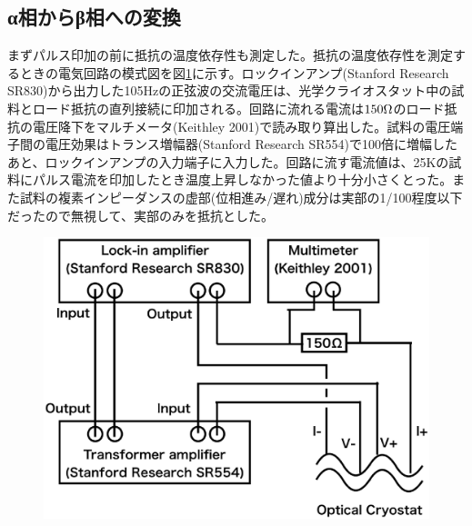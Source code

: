 \subsection{α相からβ相への変換}
まずパルス印加の前に抵抗の温度依存性も測定した。抵抗の温度依存性を測定するときの電気回路の模式図を図\ref{fig:schematics_lockin}に示す。ロックインアンプ(Stanford Research SR830)から出力した105Hzの正弦波の交流電圧は、光学クライオスタット中の試料とロード抵抗の直列接続に印加される。回路に流れる電流は$\rm 150\Omega$のロード抵抗の電圧降下をマルチメータ(Keithley 2001)で読み取り算出した。試料の電圧端子間の電圧効果はトランス増幅器(Stanford Research SR554)で100倍に増幅したあと、ロックインアンプの入力端子に入力した。回路に流す電流値は、25Kの試料にパルス電流を印加したとき温度上昇しなかった値より十分小さくとった。また試料の複素インピーダンスの虚部(位相進み/遅れ)成分は実部の1/100程度以下だったので無視して、実部のみを抵抗とした。
\begin{figure}[!h]
     \begin{center}
   \includegraphics[width=0.5\hsize]{experiment/schematics_lockin.eps}
  \end{center}
  \caption{}
  \label{fig:schematics_lockin}
\end{figure}


